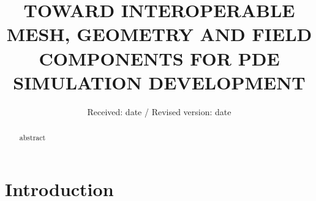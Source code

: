 \documentclass[11pt]{article}
\begin{document}
\title{\uppercase{Toward Interoperable Mesh, Geometry and Field Components for PDE Simulation Development}}
\date{Received: date / Revised version: date}

\maketitle
\begin{abstract}
abstract
\end{abstract}

\section{Introduction}

\end{document}
